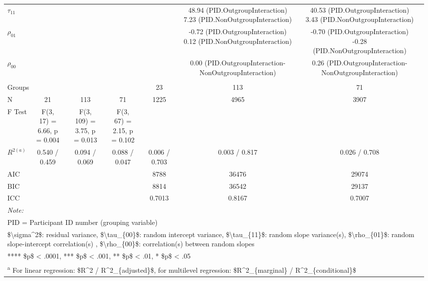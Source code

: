\begin{adjustbox}{width=\textwidth}
\begin{table}
\begin{tabular}[t]{lcccccccccccc}
$\tau_{11}$ &  &  &  &  &  &  &  &  & 48.94 (PID.OutgroupInteraction)
 7.23 (PID.NonOutgroupInteraction) &  & 40.53 (PID.OutgroupInteraction)
\hspace{1em} 3.43 (PID.NonOutgroupInteraction) & \\
$\rho_{01}$ &  &  &  &  &  &  &  &  & -0.72 (PID.OutgroupInteraction)
 0.12 (PID.NonOutgroupInteraction) &  & -0.70 (PID.OutgroupInteraction)
\hspace{1em}-0.28 (PID.NonOutgroupInteraction) & \\
\hspace{1em}$\rho_{00}$ &  &  &  &  &  &  &  &  & 0.00 (PID.OutgroupInteraction-NonOutgroupInteraction) &  & 0.26 (PID.OutgroupInteraction-NonOutgroupInteraction) & \\
\addlinespace[0.3em]
\multicolumn{13}{l}{\textbf{Fit}}\\
\hspace{1em}Groups &  &  &  &  &  &  & 23 &  & 113 &  & 71 & \\
\hspace{1em}N & 21 &  & 113 &  & 71 &  & 1225 &  & 4965 &  & 3907 & \\
\hspace{1em}F Test & F(3, 17) = 6.66, p =  0.004 &  & F(3, 109) = 3.75, p =  0.013 &  & F(3, 67) = 2.15, p =  0.102 &  &  &  &  &  &  & \\
\hspace{1em}$R^{2 (a)}$ & 0.540 / 0.459 &  & 0.094 / 0.069 &  & 0.088 / 0.047 &  & 0.006 / 0.703 &  & 0.003 / 0.817 &  & 0.026 / 0.708 & \\
\hspace{1em}AIC &  &  &  &  &  &  & 8788 &  & 36476 &  & 29074 & \\
\hspace{1em}BIC &  &  &  &  &  &  & 8814 &  & 36542 &  & 29137 & \\
\hspace{1em}ICC &  &  &  &  &  &  & 0.7013 &  & 0.8167 &  & 0.7007 & \\
\bottomrule
\multicolumn{13}{l}{\rule{0pt}{1em}\textit{Note: }}\\
\multicolumn{13}{l}{\rule{0pt}{1em}PID = Participant ID number (grouping variable)}\\
\multicolumn{13}{l}{\rule{0pt}{1em}\$\textbackslash{}sigma\textasciicircum{}2\$: residual variance, \$\textbackslash{}tau\_\{00\}\$: random intercept variance, \$\textbackslash{}tau\_\{11\}\$: random slope variance(s), \$\textbackslash{}rho\_\{01\}\$: random slope-intercept correlation(s) , \$\textbackslash{}rho\_\{00\}\$: correlation(s) between random slopes}\\
\multicolumn{13}{l}{\rule{0pt}{1em}**** \$p\$ < .0001, *** \$p\$ < .001, ** \$p\$ < .01, * \$p\$ < .05}\\
\multicolumn{13}{l}{\rule{0pt}{1em}\textsuperscript{a} For linear regression: \$R\textasciicircum{}2 / R\textasciicircum{}2\_\{adjusted\}\$, for multilevel regression: \$R\textasciicircum{}2\_\{marginal\} / R\textasciicircum{}2\_\{conditional\}\$ }\\
\end{tabular}
\end{table}
\end{adjustbox}
